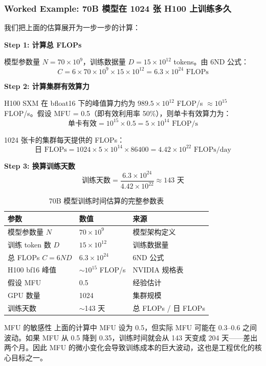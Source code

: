 \documentclass[a4paper]{article}
\begin{document}
\subsubsection{Worked Example: 70B 模型在 1024 张 H100 上训练多久}

我们把上面的估算展开为一步一步的计算：

\textbf{Step 1: 计算总 FLOPs}

模型参数量 $N = 70 \times 10^9$，训练数据量 $D = 15 \times 10^{12}$ tokens。由 6ND 公式：
$$
C = 6 \times 70 \times 10^9 \times 15 \times 10^{12} = 6.3 \times 10^{24} \text{ FLOPs}
$$

\textbf{Step 2: 计算集群有效算力}

H100 SXM 在 bfloat16 下的峰值算力约为 $989.5 \times 10^{12}$ FLOP/s $\approx 10^{15}$ FLOP/s。假设 MFU = 0.5（即有效利用率 50\%），则单卡有效算力为：
$$
\text{单卡有效} = 10^{15} \times 0.5 = 5 \times 10^{14} \text{ FLOP/s}
$$

1024 张卡的集群每天提供的 FLOPs：
$$
\text{日 FLOPs} = 1024 \times 5 \times 10^{14} \times 86400 = 4.42 \times 10^{22} \text{ FLOPs/day}
$$

\textbf{Step 3: 换算训练天数}
$$
\text{训练天数} = \frac{6.3 \times 10^{24}}{4.42 \times 10^{22}} \approx 143 \text{ 天}
$$

\begin{table}[H]
\centering
\begin{tabular}{p{}p{}p{}}
\toprule
\textbf{参数} & \textbf{数值} & \textbf{来源} \\
\midrule
模型参数量 $N$ & $70 \times 10^9$ & 模型架构定义 \\
训练 token 数 $D$ & $15 \times 10^{12}$ & 训练数据量 \\
总 FLOPs $C = 6ND$ & $6.3 \times 10^{24}$ & 6ND 公式 \\
H100 bf16 峰值 & $\sim 10^{15}$ FLOP/s & NVIDIA 规格表 \\
假设 MFU & 0.5 & 经验估计 \\
GPU 数量 & 1024 & 集群规模 \\
训练天数 & $\sim$143 天 & 总 FLOPs / 日 FLOPs \\
\bottomrule
\end{tabular}
\caption{70B 模型训练时间估算的完整参数表}
\end{table}

\begin{warningbox}{MFU 的敏感性}
上面的计算中 MFU 设为 0.5，但实际 MFU 可能在 0.3--0.6 之间波动。如果 MFU 从 0.5 降到 0.35，训练时间就会从 143 天变成 204 天——差出两个月。因此 MFU 的微小变化会导致训练成本的巨大波动，这也是工程优化的核心目标之一。
\end{warningbox}
\end{document}
